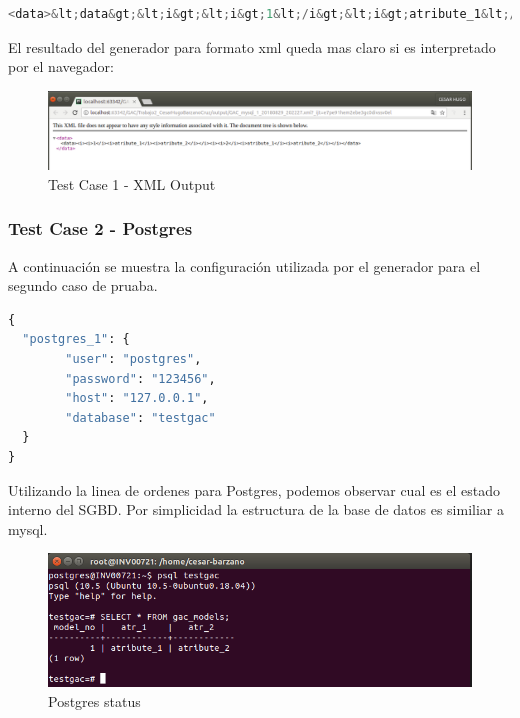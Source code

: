 \documentclass[a4paper,11pt]{book}
\begin{document}
\begin{lstlisting}[language=python,caption={Formato XML }]
<data>&lt;data&gt;&lt;i&gt;&lt;i&gt;1&lt;/i&gt;&lt;i&gt;atribute_1&lt;/i&gt;&lt;i&gt;atribute_2&lt;/i&gt;&lt;/i&gt;&lt;i&gt;&lt;i&gt;2&lt;/i&gt;&lt;i&gt;atribute_1&lt;/i&gt;&lt;i&gt;atribute_2&lt;/i&gt;&lt;/i&gt;&lt;/data&gt;</data>
\end{lstlisting}

El resultado del generador para formato xml queda mas claro si es interpretado por el navegador: 

\begin{figure}[H]  
\centering 
\includegraphics[scale=0.35]{imagenes/TestCase1_xml.png}
\caption{ Test Case 1 - XML Output }  
\end{figure} 

\subsubsection{Test Case 2 - Postgres}

A continuación se muestra la configuración utilizada por el generador para el segundo caso de pruaba. 

\begin{lstlisting}[language=python,caption={GAC\_GENERATOR\_CONFIG\_2.json }]
 {
  "postgres_1": {
		"user": "postgres",
		"password": "123456",
		"host": "127.0.0.1",
		"database": "testgac"
  }
}
\end{lstlisting}

Utilizando la linea de ordenes para Postgres, podemos observar cual es el estado interno del SGBD. Por simplicidad la estructura de la base de datos es similiar a mysql. 

\begin{figure}[H]  
\centering 
\includegraphics[scale=0.35]{imagenes/TestCase2_postgres.png}
\caption{ Postgres status }  
\end{figure} 
\end{document}

